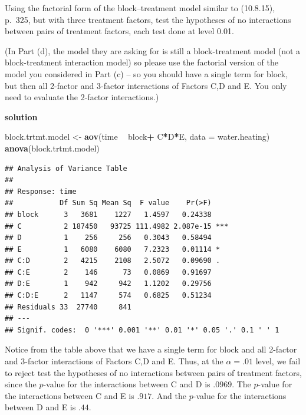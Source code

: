 \documentclass[12pt,]{article}
\newenvironment{Shaded}{\begin{snugshade}}{\end{snugshade}}
\newcommand{\KeywordTok}[1]{\textcolor[rgb]{0.13,0.29,0.53}{\textbf{#1}}}
\newcommand{\DataTypeTok}[1]{\textcolor[rgb]{0.13,0.29,0.53}{#1}}
\newcommand{\StringTok}[1]{\textcolor[rgb]{0.31,0.60,0.02}{#1}}
\newcommand{\OperatorTok}[1]{\textcolor[rgb]{0.81,0.36,0.00}{\textbf{#1}}}
\newcommand{\NormalTok}[1]{#1}
\begin{document}
Using the factorial form of the block--treatment model similar to
(10.8.15), p.~325, but with three treatment factors, test the hypotheses
of no interactions between pairs of treatment factors, each test done at
level 0.01.

(In Part (d), the model they are asking for is still a block-treatment
model (not a block-treatment interaction model) so please use the
factorial version of the model you considered in Part (c) -- so you
should have a single term for block, but then all 2-factor and 3-factor
interactions of Factors C,D and E. You only need to evaluate the
2-factor interactions.)

\textbf{solution}

\begin{Shaded}
\begin{Highlighting}[]
\NormalTok{block.trtmt.model <-}\StringTok{ }\KeywordTok{aov}\NormalTok{(time }\OperatorTok{~}\StringTok{ }\NormalTok{block}\OperatorTok{+}\StringTok{ }\NormalTok{C}\OperatorTok{*}\NormalTok{D}\OperatorTok{*}\NormalTok{E, }\DataTypeTok{data =}\NormalTok{ water.heating)}
\KeywordTok{anova}\NormalTok{(block.trtmt.model)}
\end{Highlighting}
\end{Shaded}

\begin{verbatim}
## Analysis of Variance Table
## 
## Response: time
##           Df Sum Sq Mean Sq  F value    Pr(>F)    
## block      3   3681    1227   1.4597   0.24338    
## C          2 187450   93725 111.4982 2.087e-15 ***
## D          1    256     256   0.3043   0.58494    
## E          1   6080    6080   7.2323   0.01114 *  
## C:D        2   4215    2108   2.5072   0.09690 .  
## C:E        2    146      73   0.0869   0.91697    
## D:E        1    942     942   1.1202   0.29756    
## C:D:E      2   1147     574   0.6825   0.51234    
## Residuals 33  27740     841                       
## ---
## Signif. codes:  0 '***' 0.001 '**' 0.01 '*' 0.05 '.' 0.1 ' ' 1
\end{verbatim}

Notice from the table above that we have a single term for block and all
2-factor and 3-factor interactions of Factors C,D and E. Thus, at the
\(\alpha = .01\) level, we fail to reject test the hypotheses of no
interactions between pairs of treatment factors, since the \(p\)-value
for the interactions between C and D is \(.0969\). The \(p\)-value for
the interactions between C and E is \(.917\). And the \(p\)-value for
the interactions between D and E is \(.44\).
\end{document}
